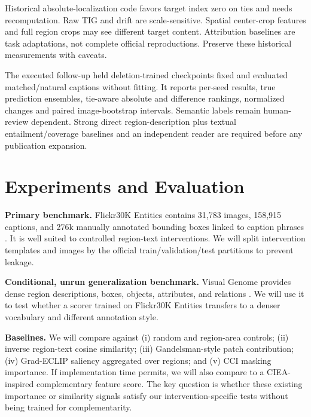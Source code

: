 \documentclass[10pt,twocolumn]{article}
\begin{document}
Historical absolute-localization code favors target index zero on ties and needs recomputation. Raw TIG and drift are scale-sensitive. Spatial center-crop features and full region crops may see different target content. Attribution baselines are task adaptations, not complete official reproductions. Preserve these historical measurements with caveats.

The executed follow-up held deletion-trained checkpoints fixed and evaluated matched/natural captions without fitting. It reports per-seed results, true prediction ensembles, tie-aware absolute and difference rankings, normalized changes and paired image-bootstrap intervals. Semantic labels remain human-review dependent. Strong direct region-description plus textual entailment/coverage baselines and an independent reader are required before any publication expansion.

\section{Experiments and Evaluation}
\textbf{Primary benchmark.} Flickr30K Entities contains 31,783 images, 158,915 captions, and 276k manually annotated bounding boxes linked to caption phrases \cite{plummer2017}. It is well suited to controlled region-text interventions. We will split intervention templates and images by the official train/validation/test partitions to prevent leakage.

\textbf{Conditional, unrun generalization benchmark.} Visual Genome provides dense region descriptions, boxes, objects, attributes, and relations \cite{krishna2017}. We will use it to test whether a scorer trained on Flickr30K Entities transfers to a denser vocabulary and different annotation style.

\textbf{Baselines.} We will compare against (i) random and region-area controls; (ii) inverse region-text cosine similarity; (iii) Gandelsman-style patch contribution; (iv) Grad-ECLIP saliency aggregated over regions; and (v) CCI masking importance. If implementation time permits, we will also compare to a CIEA-inspired complementary feature score. The key question is whether these existing importance or similarity signals satisfy our intervention-specific tests without being trained for complementarity.
\end{document}
